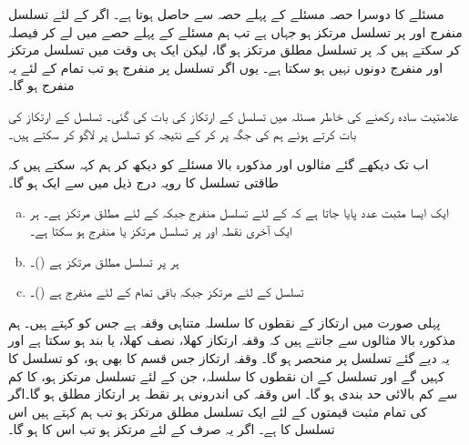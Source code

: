 مسئلے کا دوسرا حصہ مسئلے کے پہلے حصہ سے حاصل ہوتا ہے۔ اگر  کے لئے تسلسل منفرج اور  پر تسلسل مرتکز ہو جہاں  ہے تب ہم مسئلے کے پہلے حصے میں  لے کر فیصلہ کر سکتے ہیں کہ  پر تسلسل مطلق مرتکز ہو گا، لیکن ایک ہی وقت میں تسلسل مرتکز اور منفرج دونوں  نہیں ہو سکتا ہے۔ یوں اگر تسلسل  پر منفرج ہو تب تمام  کے لئے یہ  منفرج ہو گا۔

علامتیت  سادہ رکھنے کی خاطر مسئلہ  میں تسلسل   کے ارتکاز کی بات کی گئی۔ تسلسل  کے ارتکاز کی بات کرتے ہوئے ہم  کی جگہ  پر کر کے نتیجہ کو تسلسل  پر لاگو کر سکتے ہیں۔

اب تک دیکھے گئے مثالوں اور مذکورہ بالا مسئلے کو دیکھ کر ہم کہہ سکتے ہیں کہ طاقتی تسلسل کا رویہ درج ذیل میں سے ایک ہو گا۔

\begin{enumerate}[a.]
\item
ایک ایسا مثبت عدد  پایا جاتا ہے کہ  کے لئے تسلسل منفرج جبکہ  کے لئے مطلق مرتکز ہے۔ ہر ایک آخری نقطہ  اور  پر تسلسل مرتکز یا منفرج ہو سکتا ہے۔ 
\item
ہر  پر تسلسل مطلق مرتکز ہے ()۔
\item
تسلسل  کے لئے مرتکز جبکہ باقی تمام  کے لئے منفرج ہے ()۔
\end{enumerate}

پہلی صورت میں ارتکاز کے نقطوں کا سلسلہ متناہی وقفہ ہے جس کو  کہتے ہیں۔ ہم مذکورہ بالا مثالوں سے جانتے ہیں کہ وقفہ ارتکاز کھلا، نصف کھلا، یا بند ہو سکتا ہے اور یہ دیے گئے تسلسل پر منحصر ہو گا۔ وقفہ ارتکاز جس قسم کا بھی ہو،  کو تسلسل کا  کہیں گے اور تسلسل کے ان نقطوں کا سلسلہ، جن کے لئے تسلسل مرتکز ہو، کا کم سے کم بالائی حد بندی   ہو گا۔ اس وقفہ کی اندرونی ہر نقطہ پر ارتکاز مطلق ہو گا۔اگر  کی تمام مثبت قیمتوں کے لئے ایک تسلسل مطلق مرتکز ہو تب ہم کہتے ہیں اس تسلسل کا  ہے۔ اگر یہ صرف  کے لئے مرتکز ہو تب اس کا  ہو گا۔ 

